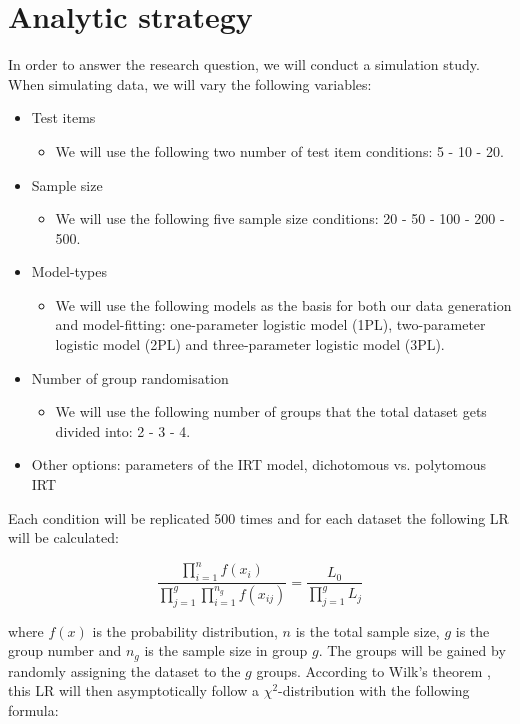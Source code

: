 \documentclass{article}
\begin{document}
\part{Analytic strategy}
In order to answer the research question, we will conduct a simulation study. When simulating data, we will vary the following variables:

\begin{itemize}
\item Test items
	\begin{itemize}
	\item We will use the following two number of test item conditions: 5 - 10 - 20.
	\end{itemize}
\item Sample size
	\begin{itemize}
	\item We will use the following five sample size conditions: 20 - 50 - 100 - 200 - 500.
	\end{itemize}
\item Model-types
	\begin{itemize}
	\item We will use the following models as the basis for both our data generation and model-fitting: one-parameter logistic model (1PL), two-parameter logistic model (2PL) and three-parameter logistic model (3PL).
	\end{itemize}
\item Number of group randomisation
	\begin{itemize}
	\item We will use the following number of groups that the total dataset gets divided into: 2 - 3 - 4.
	\end{itemize}
\item Other options: parameters of the IRT model, dichotomous vs. polytomous IRT
\end{itemize}

Each condition will be replicated 500 times and for each dataset the following LR will be calculated:

\begin{equation}
\frac{\prod_{i=1}^n f(x_i)}{\prod_{j=1}^g\prod_{i=1}^{n_g} f(x_{ij})} = \frac{L_0}{\prod_{j = 1}^g L_j}
\end{equation}

where $f(x)$ is the probability distribution, $n$ is the total sample size, $g$ is the group number and $n_g$ is the sample size in group $g$. The groups will be gained by randomly assigning the dataset to the $g$ groups. According to Wilk's theorem \autocite{wilkth}, this LR will then asymptotically follow a $\chi^2$-distribution with the following formula:
\end{document}
